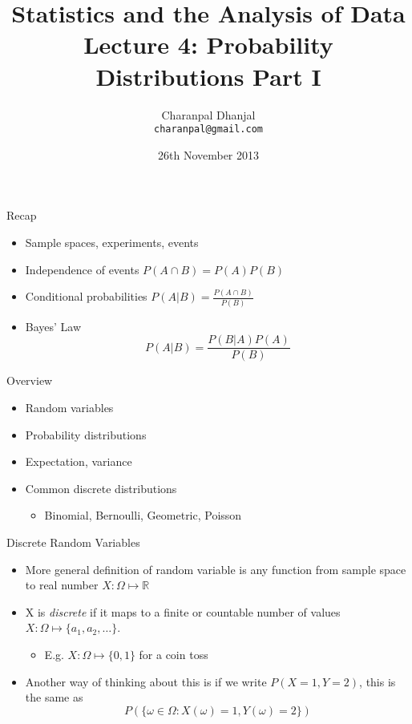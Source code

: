 \documentclass{beamer}
\title{Statistics and the Analysis of Data\\ Lecture 4: Probability Distributions Part I}
\author{Charanpal Dhanjal \\ \texttt{charanpal@gmail.com}}
\institute{\'{E}cole des Ponts}
\date{26th November 2013}
\begin{document}
\frame{\titlepage}


\begin{frame}{Recap}  
\begin{itemize} 
\item Sample spaces, experiments, events 
\item Independence of events   $P(A \cap B) = P(A)P(B)$
\item Conditional probabilities  $P(A | B) = \frac{P(A \cap B)}{P(B)}$
\item Bayes' Law 
\begin{displaymath}
 P(A | B) = \frac{P(B | A)P(A)}{P(B)}
\end{displaymath}
\end{itemize}
\end{frame}

\begin{frame}{Overview}
\begin{itemize} 
\item Random variables 
\item Probability distributions
\item Expectation, variance 
\item Common discrete distributions 
\begin{itemize}
\item Binomial, Bernoulli, Geometric, Poisson 
\end{itemize}  
\end{itemize}
\end{frame}

\begin{frame}{Discrete Random Variables} 
\begin{itemize} 
 \item More general definition of random variable is any function from sample space to real number $X: \Omega \mapsto \mathbb{R}$ 
\item X is \emph{discrete} if it maps to a finite or countable number of values $X: \Omega \mapsto \{a_1, a_2, \ldots \}$. 
\begin{itemize} 
\item E.g. $X: \Omega \mapsto \{0, 1\}$ for a coin toss 
\end{itemize} 
 \item Another way of thinking about this is if we write $P(X=1, Y=2)$, this is the same as 
 \begin{displaymath}
  P(\{\omega \in \Omega: X(\omega) = 1, Y(\omega) = 2\}) 
 \end{displaymath}
 \end{itemize}
\end{frame}
\end{document}
